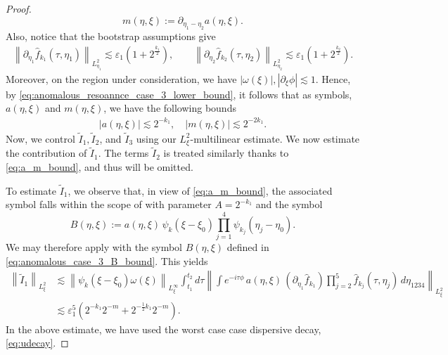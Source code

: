 \documentclass[reqno,english,11pt]{amsart}
\newcommand{\eps}{\varepsilon}
\newcommand{\snorm}[1]{\left\|#1\right\|}
\theoremstyle{definition}
\numberwithin{equation}{section}
\begin{document}
\begin{proof}
\begin{equation}
m(\eta,\xi)
:=\partial_{\eta_1-\eta_2} a(\eta,\xi).
\end{equation}
Also, notice that the bootstrap assumptions give
\begin{subequations}\label{eqn:derivative_hits_cutoff}
    \begin{align}
        \snorm{\partial_{\eta_{1}}\widehat{f}_{k_{1}}(\tau, \eta_{1})}_{L^2_{\eta_{1}}} \lesssim \eps_1\left(1 + 2^{\frac{k_1}{2}}\right),\qquad\snorm{\partial_{\eta_{2}}\widehat{f}_{k_2}(\tau, \eta_{2})}_{L^2_{\eta_{2}}} \lesssim \eps_1\left(1 + 2^{\frac{k_2}{2}}\right). 
    \end{align}
\end{subequations}
Moreover, on the region under consideration, we have $|\omega(\xi)|, |\partial_{\xi}\phi|\lesssim 1$. Hence, by \eqref{eq:anomalous_resoannce_case_3_lower_bound}, it follows that  as symbols, $a(\eta,\xi)$ and $m(\eta,\xi)$, we have the following bounds
    \begin{align}\label{eq:a_m_bound}
     |a(\eta,\xi) | \lesssim 2^{-k_{1}}, \quad |m(\eta,\xi)| \lesssim 2^{-2k_{1}}. 
    \end{align}
Now, we control $\tilde{I}_{1}, \tilde{I}_{2}$, and $\tilde{I}_{3}$ using our $L^2_{\xi}$-multilinear estimate. We now estimate the contribution of $\tilde I_1$.
The terms $\tilde I_2$ is treated similarly thanks to \eqref{eq:a_m_bound}, and thus will be omitted.

To estimate $\tilde I_1$, we observe that, in view of \eqref{eq:a_m_bound},
the associated symbol falls within the scope of \cite[Lemma~B.3]{Morgan}
with parameter $A=2^{-k_1}$ and the symbol
\begin{equation}\label{eq:anomalous_case_3_B_bound}
B(\eta,\xi) := a(\eta,\xi)\,\psi_k(\xi-\xi_0)\prod_{j=1}^4 \psi_{k_j}(\eta_j-\eta_0).
\end{equation}
We may therefore apply \cite[Proposition~B.1]{Morgan} with the symbol
$B(\eta,\xi)$ defined in \eqref{eq:anomalous_case_3_B_bound}. This yields
\begin{align*}
    \snorm{\tilde{I}_{1}}_{L^2_{\xi}} &\lesssim \snorm{\psi_{k}(\xi-\xi_0)\omega(\xi)}_{L^{\infty}_{\xi}} \int_{t_1}^{t_2} d \tau \snorm{\int e^{-i\tau\phi}\,a(\eta,\xi)\,(\partial_{\eta_1}\hat f_{k_1})\prod^5_{j=2}\hat f_{k_j}(\tau,\eta_j) \,d\eta_{1234}
    }_{L^2_{\xi}}
    \\
    &\lesssim  \eps_1^{5}\left(2^{-k_{1}}2^{-m} + 2^{-\frac{1}{2}k_{1}}2^{-m}\right).
\end{align*}
In the above estimate, we have used the worst case case dispersive decay, \eqref{eq:udecay}.


\end{proof}
\end{document}

